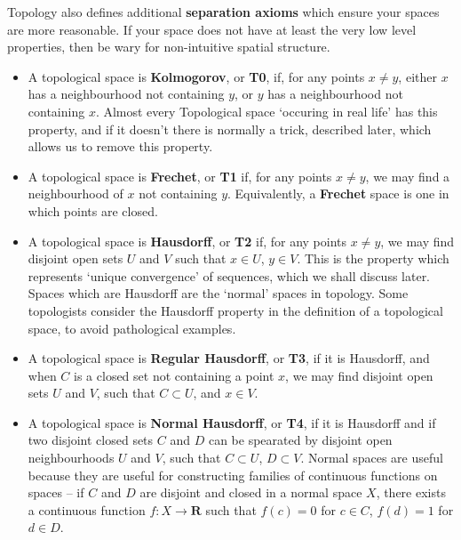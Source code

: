 Topology also defines additional {\bf separation axioms} which ensure your spaces are more reasonable. If your space does not have at least the very low level properties, then be wary for non-intuitive spatial structure.

\begin{itemize}
    \item A topological space is {\bf Kolmogorov}, or {\bf T0}, if, for any points $x \neq y$, either $x$ has a neighbourhood not containing $y$, or $y$ has a neighbourhood not containing $x$. Almost every Topological space `occuring in real life' has this property, and if it doesn't there is normally a trick, described later, which allows us to remove this property.
    \item A topological space is {\bf Frechet}, or {\bf T1} if, for any points $x \neq y$, we may find a neighbourhood of $x$ not containing $y$. Equivalently, a {\bf Frechet} space is one in which points are closed.
    \item A topological space is {\bf Hausdorff}, or {\bf T2} if, for any points $x \neq y$, we may find disjoint open sets $U$ and $V$ such that $x \in U$, $y \in V$. This is the property which represents `unique convergence' of sequences, which we shall discuss later. Spaces which are Hausdorff are the `normal' spaces in topology. Some topologists consider the Hausdorff property in the definition of a topological space, to avoid pathological examples.
    \item A topological space is {\bf Regular Hausdorff}, or {\bf T3}, if it is Hausdorff, and when $C$ is a closed set not containing a point $x$, we may find disjoint open sets $U$ and $V$, such that $C \subset U$, and $x \in V$.
    \item A topological space is {\bf Normal Hausdorff}, or {\bf T4}, if it is Hausdorff and if two disjoint closed sets $C$ and $D$ can be spearated by disjoint open neighbourhoods $U$ and $V$, such that $C \subset U$, $D \subset V$. Normal spaces are useful because they are useful for constructing families of continuous functions on spaces -- if $C$ and $D$ are disjoint and closed in a normal space $X$, there exists a continuous function $f: X \to \mathbf{R}$ such that $f(c) = 0$ for $c \in C$, $f(d) = 1$ for $d \in D$.
\end{itemize}

